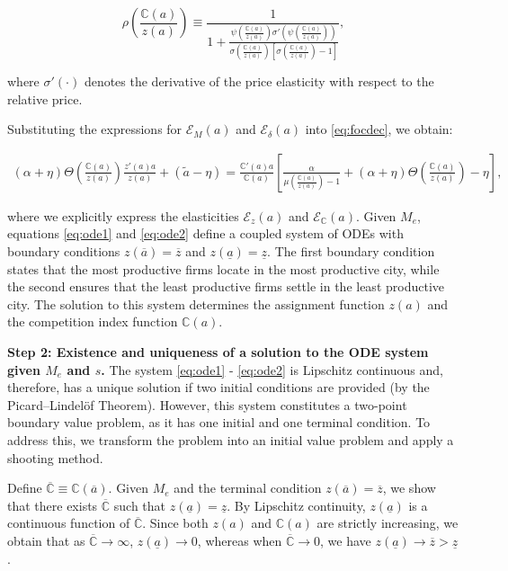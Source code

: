 \begin{equation*}
	\rho\left(\frac{\mathbb{C}(a)}{z(a)}\right) \equiv \frac{1}{1 + \frac{\psi\left(\frac{\mathbb{C}(a)}{z(a)}\right) \sigma'\left(\psi\left(\frac{\mathbb{C}(a)}{z(a)}\right)\right)}{\sigma\left(\frac{\mathbb{C}(a)}{z(a)}\right)\left[\sigma\left(\frac{\mathbb{C}(a)}{z(a)}\right) - 1\right]}},
\end{equation*}

where $\sigma'(\cdot)$ denotes the derivative of the price elasticity with respect to the relative price.

Substituting the expressions for $\mathcal{E}_{M}(a)$ and $\mathcal{E}_{\delta}(a)$ into \eqref{eq:focdec}, we obtain:

\begin{align}\label{eq:ode2}
    (\alpha + \eta)\Theta\left(\frac{\mathbb{C}(a)}{z(a)}\right)\frac{z'(a)a}{z(a)} + (\widetilde{a} - \eta) = \frac{\mathbb{C}'(a)a}{\mathbb{C}(a)} \left[ \frac{\alpha}{\mu\left(\frac{\mathbb{C}(a)}{z(a)}\right) - 1} + (\alpha + \eta)\Theta\left(\frac{\mathbb{C}(a)}{z(a)}\right) - \eta \right],
\end{align}

where we explicitly express the elasticities $\mathcal{E}_z(a)$ and $\mathcal{E}_\mathbb{C}(a)$. Given $M_e$, equations \eqref{eq:ode1} and \eqref{eq:ode2} define a coupled system of ODEs with boundary conditions $z(\overline{a}) = \overline{z}$ and $z(\underline{a}) = \underline{z}$. The first boundary condition states that the most productive firms locate in the most productive city, while the second ensures that the least productive firms settle in the least productive city. The solution to this system determines the assignment function $z(a)$ and the competition index function $\mathbb{C}(a)$.

\textbf{Step 2: Existence and uniqueness of a solution to the ODE system given $M_e$ and $s$.}  
The system \eqref{eq:ode1} - \eqref{eq:ode2} is Lipschitz continuous and, therefore, has a unique solution if two initial conditions are provided (by the Picard–Lindel\"{o}f Theorem). However, this system constitutes a two-point boundary value problem, as it has one initial and one terminal condition. To address this, we transform the problem into an initial value problem and apply a shooting method.  

Define $\overline{\mathbb{C}} \equiv \mathbb{C}(\overline{a})$. Given $M_e$ and the terminal condition $z(\overline{a}) = \overline{z}$, we show that there exists $\overline{\mathbb{C}}$ such that $z(\underline{a}) = \underline{z}$. By Lipschitz continuity, $z(\underline{a})$ is a continuous function of $\overline{\mathbb{C}}$. Since both $z(a)$ and $\mathbb{C}(a)$ are strictly increasing, we obtain that as $\overline{\mathbb{C}} \to \infty$, $z(\underline{a}) \to 0$, whereas when $\overline{\mathbb{C}} \to 0$, we have $z(\underline{a}) \to \overline{z} > \underline{z}$.  

